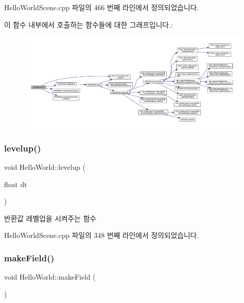 Hello\+World\+Scene.\+cpp 파일의 466 번째 라인에서 정의되었습니다.

이 함수 내부에서 호출하는 함수들에 대한 그래프입니다.\+:
\nopagebreak
\begin{figure}[H]
\begin{center}
\leavevmode
\includegraphics[width=350pt]{class_hello_world_a65e2b1525051f3690e5a39ca56608a97_cgraph}
\end{center}
\end{figure}
\mbox{\label{class_hello_world_af1590254503ba391a084d767df2dd858}} 
\subsubsection{\texorpdfstring{levelup()}{levelup()}}
{\footnotesize\ttfamily void Hello\+World\+::levelup (\begin{DoxyParamCaption}\item[{float}]{dt }\end{DoxyParamCaption})\hspace{0.3cm}{\ttfamily [protected]}}

\begin{DoxyReturn}{반환값}
레벨업을 시켜주는 함수 
\end{DoxyReturn}


Hello\+World\+Scene.\+cpp 파일의 348 번째 라인에서 정의되었습니다.

\mbox{\label{class_hello_world_ac7cca1564e8be641f0d52b97040c0a69}} 
\subsubsection{\texorpdfstring{make\+Field()}{makeField()}}
{\footnotesize\ttfamily void Hello\+World\+::make\+Field (\begin{DoxyParamCaption}{ }\end{DoxyParamCaption})\hspace{0.3cm}{\ttfamily [protected]}}

